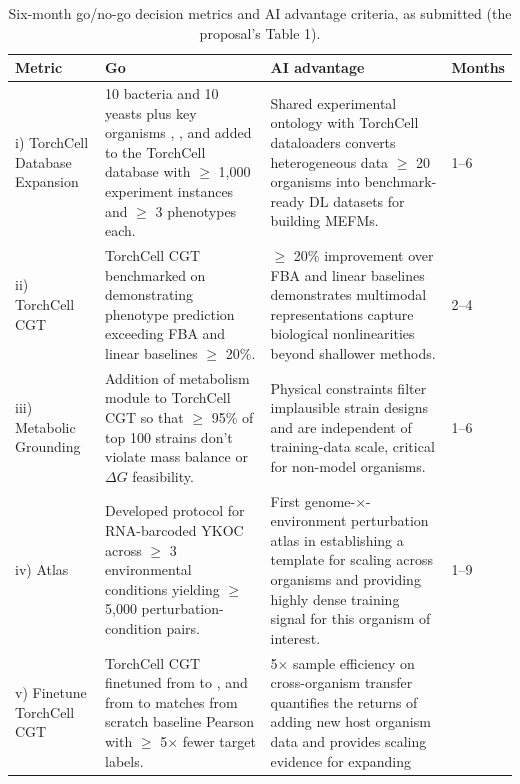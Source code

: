 \begin{table}[H]
  \centering\footnotesize
  \caption{Six-month go/no-go decision metrics and AI advantage criteria, as
  submitted (the proposal's Table 1).}
  \label{tab:gonogo}
  \begin{tabular}{L{30mm}L{62mm}L{62mm}L{12mm}}
    \toprule
    \textbf{Metric} & \textbf{Go} & \textbf{AI advantage} & \textbf{Months} \\
    \midrule
    i) TorchCell Database Expansion &
    10 bacteria and 10 yeasts plus key organisms , ,
    and  added to the TorchCell database with $\geq$ 1,000
    experiment instances and $\geq$ 3 phenotypes each. &
    Shared experimental ontology with TorchCell dataloaders converts heterogeneous
    data $\geq$ 20 organisms into benchmark-ready DL datasets for building MEFMs. &
    1--6 \\
    \midrule
    ii) TorchCell CGT  &
    TorchCell CGT benchmarked on  demonstrating phenotype prediction
    exceeding FBA and linear baselines $\geq$ 20\%. &
    $\geq$ 20\% improvement over FBA and linear baselines demonstrates multimodal
    representations capture biological nonlinearities beyond shallower methods. &
    2--4 \\
    \midrule
    iii) Metabolic Grounding &
    Addition of metabolism module to TorchCell CGT so that $\geq$ 95\% of top 100
    strains don't violate mass balance or $\Delta G$ feasibility. &
    Physical constraints filter implausible strain designs and are independent of
    training-data scale, critical for non-model organisms. &
    1--6 \\
    \midrule
    iv)  Atlas &
    Developed protocol for  RNA-barcoded YKOC across $\geq$ 3
    environmental conditions yielding $\geq$ 5,000 perturbation-condition pairs. &
    First genome-$\times$-environment perturbation atlas in 
    establishing a template for scaling across organisms and providing highly dense
    training signal for this organism of interest. &
    1--9 \\
    \midrule
    v) Finetune TorchCell CGT &
    TorchCell CGT finetuned from  to , and
    from  to  matches from scratch baseline Pearson
    with $\geq$ 5$\times$ fewer target labels. &
    5$\times$ sample efficiency on cross-organism transfer quantifies the returns
    of adding new host organism data and provides scaling evidence for expanding

\end{tabular}
\end{table}
